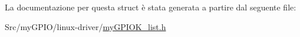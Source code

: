 La documentazione per questa struct è stata generata a partire dal seguente file\+:\begin{DoxyCompactItemize}
\item 
Src/my\+G\+P\+I\+O/linux-\/driver/\hyperlink{my_g_p_i_o_k__list_8h}{my\+G\+P\+I\+O\+K\+\_\+list.\+h}\end{DoxyCompactItemize}

